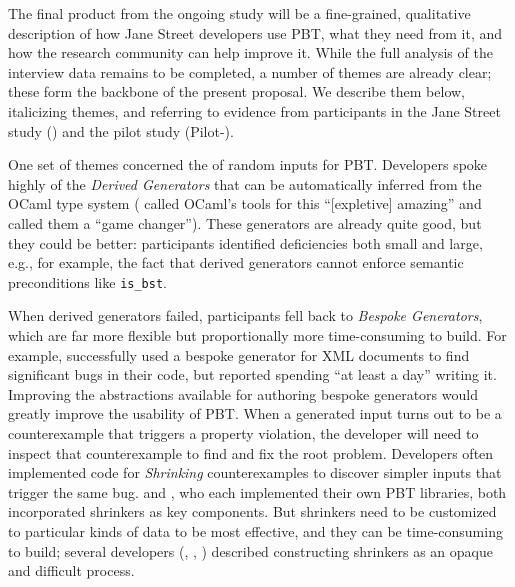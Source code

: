 \ifthemecolors{}\fi
\newcommand{\proptheme}[1]{{\ifthemecolors\color{nord-orange}\fi \em #1}}
\newcommand{\gentheme}[1]{{\ifthemecolors\color{nord-green}\fi \em #1}}
\newcommand{\evaltheme}[1]{{\ifthemecolors\color{nord-purple}\fi \em #1}}
\newcommand{\edutheme}[1]{{\ifthemecolors\color{nord-frost4}\fi \em #1}}

 The final product from
the ongoing study will be a fine-grained, qualitative description of how
Jane Street developers use PBT, what they need from it, and how the
research community can
help improve it.  While the full analysis of the interview data remains
to be completed, a number of themes are already clear; these
form the backbone of the present proposal. We describe them below,
italicizing themes, and
referring to evidence from participants in the Jane Street study
()
and the pilot study (Pilot-).

One set of themes concerned the  of
random inputs for PBT. Developers spoke
highly of the \gentheme{Derived Generators} that can be automatically
inferred from
the OCaml type system ( called OCaml's tools for this
``[expletive] amazing'' and  called them a ``game changer'').
These generators are already quite good, but they could be better: participants
identified deficiencies both small and large, e.g., for example, the fact
that derived generators
cannot enforce semantic preconditions like \lstinline{is_bst}.


When derived generators
failed, participants fell back to \gentheme{Bespoke Generators}, which
are far more flexible but proportionally more time-consuming to
build. For example,  successfully used a bespoke
generator for XML documents to find significant bugs in their code,
but reported spending ``at least a day'' writing it.
Improving the abstractions available for authoring bespoke generators would
greatly improve the usability of PBT.
%
When a generated input turns out to be a counterexample that triggers
a property violation, the developer will need to inspect that
counterexample to find
and fix the root problem. Developers often implemented code for
\gentheme{Shrinking} counterexamples to discover
simpler inputs that trigger the same bug.  
and , who each implemented their own PBT libraries, both
incorporated shrinkers as key components. But
shrinkers need to be customized to particular kinds of data to be most
effective, and they can be time-consuming to build; several
developers
(,  , )
described constructing shrinkers as an opaque and difficult process.

